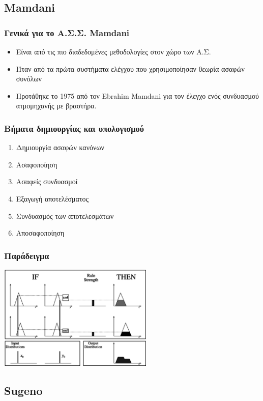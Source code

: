 \documentclass[xetex,serif,mathserif,14pt]{beamer}
\begin{document}
\subsection{Mamdani}

\begin{frame}
\frametitle{Γενικά για το Α.Σ.Σ. Mamdani}
\begin{itemize}
  \item Είναι από τις πιο διαδεδομένες μεθοδολογίες στον χώρο των Α.Σ.\pause
  \item Ήταν από τα πρώτα συστήματα ελέγχου που χρησιμοποίησαν θεωρία ασαφών συνόλων\pause
  \item Προτάθηκε το 1975 από τον Ebrahim Mamdani για τον έλεγχο ενός συνδυασμού ατμομηχανής με βραστήρα.
\end{itemize}
\end{frame}

\begin{frame}
\frametitle{Βήματα δημιουργίας και υπολογισμού}
\begin{enumerate}
  \item Δημιουργία ασαφών κανόνων\pause
  \item Ασαφοποίηση\pause
  \item Ασαφείς συνδυασμοί\pause
  \item Εξαγωγή αποτελέσματος\pause
  \item Συνδυασμός των αποτελεσμάτων\pause
  \item Αποσαφοποίηση
\end{enumerate}
\end{frame}

\begin{frame}
\frametitle{Παράδειγμα}
\centering
\includegraphics[height=5cm]{images/fuzzy001.png}
\end{frame}

\subsection{Sugeno}
\end{document}
